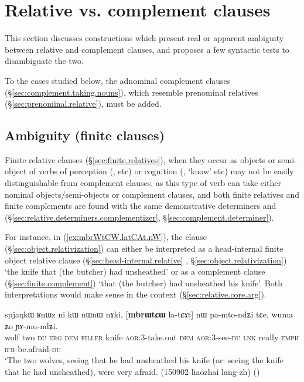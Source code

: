 
\section{Relative vs. complement clauses}  \label{sec:relative.complement.ambiguities}
This section discusses constructions which present real or apparent ambiguity between relative and complement clauses, and proposes a few syntactic tests to disambiguate the two.

To the cases studied below, the adnominal complement clauses (§\ref{sec:complement.taking.nouns}), which resemble prenominal relatives (§\ref{sec:prenominal.relative}), must be added.


\subsection{Ambiguity (finite clauses)} \label{sec:finite.relative.complement.ambiguity}
Finite relative clauses (§\ref{sec:finite.relatives}), when they occur as objects or semi-object of verbs of perception (,  etc) or cognition (, `know' etc) may not be easily distinguishable from complement clauses, as this type of verb can take either nominal objects/semi-objects or complement clauses, and both finite relatives and finite complements are found with the same demonstrative determiners  and  (§\ref{sec:relative.determiners.complementizer}, §\ref{sec:complement.determiner}).

For instance, in (\ref{ex:mbrWtCW.latCAt.nW}), the clause  (§\ref{sec:object.relativization}) can either be interpreted as a head-internal finite object relative clause (§\ref{sec:head-internal.relative} , §\ref{sec:object.relativization}) `the knife that (the butcher) had unsheathed' or as a complement clause (§\ref{sec:finite.complement}) `that (the butcher) had unsheathed his knife'. Both interpretations would make sense in the context (§\ref{sec:relative.core.arg}).

\begin{exe}
\ex \label{ex:mbrWtCW.latCAt.nW}
\gll spjaŋkɯ ʁnɯz ni kɯ nɯnɯ nɤki, [\textbf{mbrɯtɕɯ} la-tɕɤt] nɯ pa-mto-ndʑi tɕe, wuma ʑo ɲɤ-mu-ndʑi. \\
wolf two \textsc{du} \textsc{erg} \textsc{dem} \textsc{filler} knife \textsc{aor}:3\flobv{}-take.out \textsc{dem} \textsc{aor}:3\flobv{}-see-\textsc{du} \textsc{lnk} really \textsc{emph} \textsc{ifr}-be.afraid-\textsc{du} \\
\glt `The two wolves, seeing that he had unsheathed his knife (or: seeing the knife that he had unsheathed), were very afraid. (150902 liaozhai lang-zh)
()
\end{exe}

